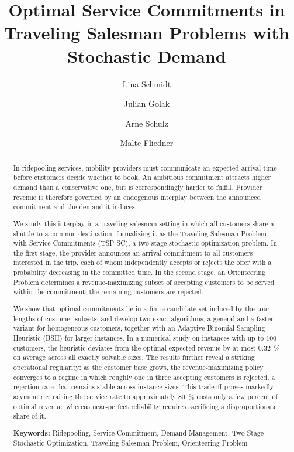 \documentclass[11pt]{article}
\title{Optimal Service Commitments in Traveling Salesman Problems with Stochastic Demand}
\date{}
\author[1]{Lina Schmidt}
\author[1]{Julian Golak}
\author[1]{Arne Schulz}
\author[1]{Malte Fliedner}
\affil[1]{\footnotesize Institute of Operations Management, University of Hamburg Business School, Hamburg, Germany. \texttt{\{lina.schmidt, julian.golak, arne.schulz, malte.fliedner\}@uni-hamburg.de}}
\theoremstyle{plain}
\theoremstyle{definition}
\begin{document}
\maketitle
\begin{abstract}
\medskip
In ridepooling services, mobility providers must communicate an expected arrival time before customers decide whether to book. An ambitious commitment attracts higher demand than a conservative one, but is correspondingly harder to fulfill. Provider revenue is therefore governed by an endogenous interplay between the announced commitment and the demand it induces.

We study this interplay in a traveling salesman setting in which all customers share a shuttle to a common destination, formalizing it as the Traveling Salesman Problem with Service Commitments (TSP-SC), a two-stage stochastic optimization problem. In the first stage, the provider announces an arrival commitment to all customers interested in the trip, each of whom independently accepts or rejects the offer with a probability decreasing in the committed time. In the second stage, an Orienteering Problem determines a revenue-maximizing subset of accepting customers to be served within the commitment; the remaining customers are rejected.

We show that optimal commitments lie in a finite candidate set induced by the tour lengths of customer subsets, and develop two exact algorithms, a general and a faster variant for homogeneous customers, together with an Adaptive Binomial Sampling Heuristic (BSH) for larger instances. In a numerical study on instances with up to 100 customers, the heuristic deviates from the optimal expected revenue by at most 0.32~\% on average across all exactly solvable sizes. The results further reveal a striking operational regularity: as the customer base grows, the revenue-maximizing policy converges to a regime in which roughly one in three accepting customers is rejected, a rejection rate that remains stable across instance sizes. This tradeoff proves markedly asymmetric: raising the service rate to approximately 80~\% costs only a few percent of optimal revenue, whereas near-perfect reliability requires sacrificing a disproportionate share of it.
\medskip

\noindent \textbf{Keywords:} Ridepooling, Service Commitment, Demand Management, Two-Stage Stochastic Optimization, Traveling Salesman Problem, Orienteering Problem

\end{abstract}
\end{document}

